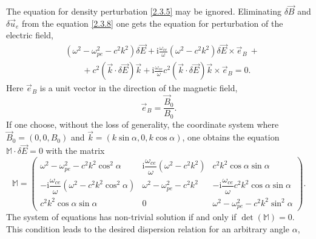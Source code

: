 The equation for density perturbation \ref{2.3.5} may be ignored. Eliminating $ \delta \vec{B} $ and $ \delta \vec{u}_{e} $ from the equation \ref{2.3.8} one gets the equation for perturbation of the electric field,
\begin{equation}
\begin{split}
\label{2.3.9}
& \left( \omega^{2} - \omega_{pe}^{2} - c^{2} k^{2} \right) \delta \vec{E} + \mathrm{i} \frac{\omega_{ce}}{\omega} \left( \omega^{2} - c^{2} k^{2} \right) \delta \vec{E} \times \vec{e}_{B} \: + \\[5pt]
& \qquad + c^{2} \left( \vec{k} \cdot \delta \vec{E} \right) \vec{k} + \mathrm{i} \frac{\omega_{ce}}{\omega} c^{2} \left( \vec{k} \cdot \delta \vec{E} \right) \vec{k} \times \vec{e}_{B} = 0.
\end{split}
\end{equation}
Here $ \vec{e}_{B} $ is a unit vector in the direction of the magnetic field,
\begin{equation}
\label{2.3.10}
\vec{e}_{B} = \frac{\vec{B}_{0}}{B_{0}}.
\end{equation}
If one choose, without the loss of generality, the coordinate system where $ \vec{B}_{0} = (0, 0, B_{0}) $ and $ \vec{k} = (k \sin \alpha, 0, k \cos \alpha) $, one obtains the equation $ \mathbb{M} \cdot \delta \vec{E} = 0 $ with the matrix
\begingroup
\renewcommand*{\arraystretch}{1.8}
\begin{equation}
\label{2.3.11}
\mathbb{M} =  \begin{pmatrix}
 \omega^{2} - \omega_{pe}^{2} - c^{2} k^{2} \cos^{2} \alpha & \mathrm{i} \dfrac{\omega_{ce}}{\omega} \left( \omega^{2} - c^{2} k^{2} \right)  & c^{2} k^{2} \cos \alpha \sin \alpha \\
 - \mathrm{i} \dfrac{\omega_{ce}}{\omega} \left( \omega^{2} - c^{2} k^{2} \cos^{2} \alpha \right) & \omega^{2} - \omega_{pe}^{2} - c^{2} k^{2} & - \mathrm{i} \dfrac{\omega_{ce}}{\omega} c^{2} k^{2} \cos \alpha \sin \alpha \\
 c^{2} k^{2} \cos \alpha \sin \alpha & 0 & \omega^{2} - \omega_{pe}^{2} - c^{2} k^{2} \sin^{2} \alpha
 \end{pmatrix}.
\end{equation} 
\endgroup
The system of equations has non-trivial solution if and only if $ \det \left( \mathbb{M} \right) = 0 $. This condition leads to the desired dispersion relation for an arbitrary angle $ \alpha $,
